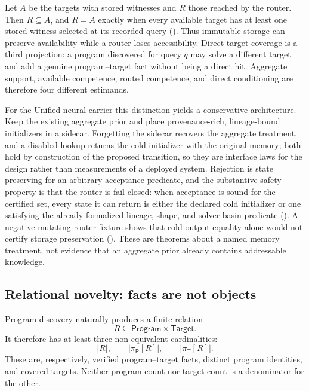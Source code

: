 \documentclass[11pt,openany]{report}
\begin{document}
Let $A$ be the targets with stored witnesses and $R$ those reached by the
router.  Then $R\subseteq A$, and $R=A$ exactly when every available target has
at least one stored witness selected at its recorded query
().  Thus immutable storage can
preserve availability while a router loses accessibility.  Direct-target
coverage is a third projection: a program discovered for query $q$ may solve a
different target and add a genuine program--target fact without being a direct
hit.  Aggregate support, available competence, routed competence, and direct
conditioning are therefore four different estimands.

For the Unified neural carrier this distinction yields a conservative
architecture.  Keep the existing aggregate prior and place provenance-rich,
lineage-bound initializers in a sidecar.  Forgetting the sidecar recovers the
aggregate treatment, and a disabled lookup returns the cold initializer with the
original memory; both hold by construction of the proposed transition, so they
are interface laws for the design rather than measurements of a deployed system.
Rejection is state preserving for an arbitrary acceptance predicate, and the
substantive safety property is that the router is fail-closed: when acceptance is
sound for the certified set, every state it can return is either the declared cold
initializer or one satisfying the already formalized lineage, shape, and
solver-basin predicate
().  A
negative mutating-router fixture shows that cold-output equality alone would not
certify storage preservation
().  These are theorems about a named memory
treatment, not evidence that an aggregate prior already contains addressable
knowledge.

\subsection{Relational novelty: facts are not objects}

Program discovery naturally produces a finite relation
\[
  R\subseteq \mathsf{Program}\times\mathsf{Target}.
\]
It therefore has at least three non-equivalent cardinalities:
\[
  |R|,\qquad |\pi_{\mathsf P}[R]|,\qquad
  |\pi_{\mathsf T}[R]|.
\]
These are, respectively, verified program--target facts, distinct program
identities, and covered targets.  Neither program count nor target count is a
denominator for the other.
\end{document}
